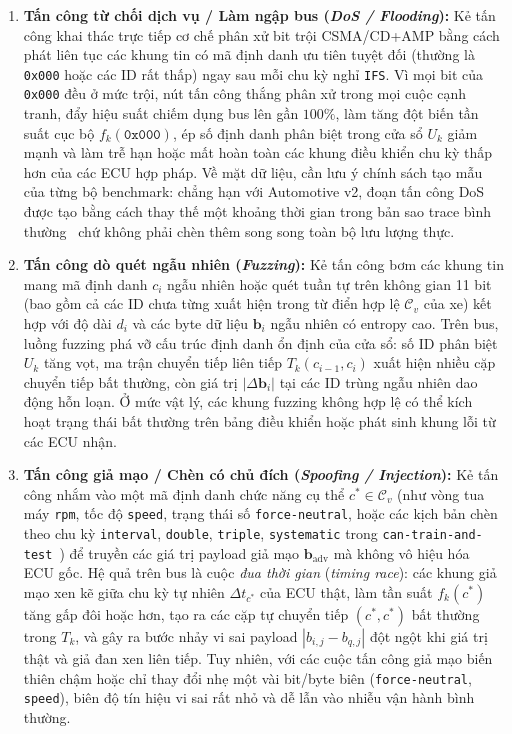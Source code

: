 \documentclass[12pt, a4paper, reqno, oneside]{book}
\DeclareRobustCommand{\code}[1]{\nolinkurl{#1}}
\begin{document}
\begin{enumerate}
    \item \textbf{Tấn công từ chối dịch vụ / Làm ngập bus (\textit{DoS / Flooding}):} Kẻ tấn công khai thác trực tiếp cơ chế phân xử bit trội CSMA/CD+AMP bằng cách phát liên tục các khung tin có mã định danh ưu tiên tuyệt đối (thường là \texttt{0x000} hoặc các ID rất thấp) ngay sau mỗi chu kỳ nghỉ \code{IFS}. Vì mọi bit của \texttt{0x000} đều ở mức trội, nút tấn công thắng phân xử trong mọi cuộc cạnh tranh, đẩy hiệu suất chiếm dụng bus lên gần $100\%$, làm tăng đột biến tần suất cục bộ $f_k(\texttt{0x000})$, ép số định danh phân biệt trong cửa sổ $U_k$ giảm mạnh và làm trễ hạn hoặc mất hoàn toàn các khung điều khiển chu kỳ thấp hơn của các ECU hợp pháp. Về mặt dữ liệu, cần lưu ý chính sách tạo mẫu của từng bộ benchmark: chẳng hạn với Automotive v2, đoạn tấn công DoS được tạo bằng cách thay thế một khoảng thời gian trong bản sao trace bình thường~\cite{dupont2019automotive} chứ không phải chèn thêm song song toàn bộ lưu lượng thực.
    \item \textbf{Tấn công dò quét ngẫu nhiên (\textit{Fuzzing}):} Kẻ tấn công bơm các khung tin mang mã định danh $c_i$ ngẫu nhiên hoặc quét tuần tự trên không gian 11 bit (bao gồm cả các ID chưa từng xuất hiện trong từ điển hợp lệ $\mathcal{C}_v$ của xe) kết hợp với độ dài $d_i$ và các byte dữ liệu $\mathbf{b}_i$ ngẫu nhiên có entropy cao. Trên bus, luồng fuzzing phá vỡ cấu trúc định danh ổn định của cửa sổ: số ID phân biệt $U_k$ tăng vọt, ma trận chuyển tiếp liên tiếp $T_k(c_{i-1}, c_i)$ xuất hiện nhiều cặp chuyển tiếp bất thường, còn giá trị $|\Delta \mathbf{b}_i|$ tại các ID trùng ngẫu nhiên dao động hỗn loạn. Ở mức vật lý, các khung fuzzing không hợp lệ có thể kích hoạt trạng thái bất thường trên bảng điều khiển hoặc phát sinh khung lỗi từ các ECU nhận.
    \item \textbf{Tấn công giả mạo / Chèn có chủ đích (\textit{Spoofing / Injection}):} Kẻ tấn công nhắm vào một mã định danh chức năng cụ thể $c^* \in \mathcal{C}_v$ (như vòng tua máy \code{rpm}, tốc độ \code{speed}, trạng thái số \code{force-neutral}, hoặc các kịch bản chèn theo chu kỳ \code{interval}, \code{double}, \code{triple}, \code{systematic} trong \texttt{can-train-and-test}~\cite{lampe2024curated}) để truyền các giá trị payload giả mạo $\mathbf{b}_{\text{adv}}$ mà không vô hiệu hóa ECU gốc. Hệ quả trên bus là cuộc \emph{đua thời gian} (\textit{timing race}): các khung giả mạo xen kẽ giữa chu kỳ tự nhiên $\Delta t_{c^*}$ của ECU thật, làm tần suất $f_k(c^*)$ tăng gấp đôi hoặc hơn, tạo ra các cặp tự chuyển tiếp $(c^*, c^*)$ bất thường trong $T_k$, và gây ra bước nhảy vi sai payload $|b_{i,j} - b_{q,j}|$ đột ngột khi giá trị thật và giả đan xen liên tiếp. Tuy nhiên, với các cuộc tấn công giả mạo biến thiên chậm hoặc chỉ thay đổi nhẹ một vài bit/byte biên (\code{force-neutral}, \code{speed}), biên độ tín hiệu vi sai rất nhỏ và dễ lẫn vào nhiễu vận hành bình thường.

\end{enumerate}
\end{document}
